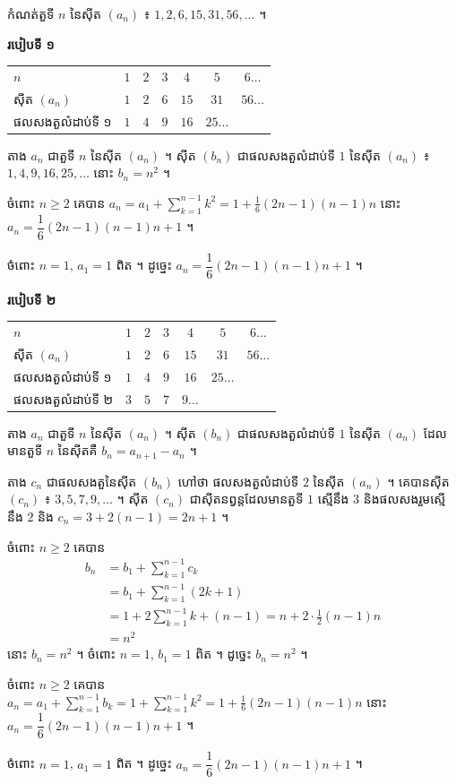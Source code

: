 \begin{example}[ឧទាហរណ៍]
កំណត់តួទី $n$ នៃស៊ីត $(a_n)$ ៖ $1, 2, 6, 15, 31, 56, \ldots$ ។

\textbf{របៀបទី ១}
\begin{center}
\begin{tabular}{lcccccc}
$n$ & $1$ & $2$ & $3$ & $4$ & $5$ & $6\ldots$\\
ស៊ីត $(a_n)$ & $1$ & $2$ & $6$ & $15$ & $31$ & $56\ldots$\\
ផលសងតួលំដាប់ទី ១ & $1$ & $4$ & $9$ & $16$ & $25\ldots$ &
\end{tabular}
\end{center}
តាង $a_n$ ជាតួទី $n$ នៃស៊ីត $(a_n)$ ។ ស៊ីត $(b_n)$ ជាផលសងតួលំដាប់ទី $1$ នៃស៊ីត $(a_n)$ ៖ $1, 4, 9, 16, 25, \ldots$ នោះ $b_n = n^2$ ។

ចំពោះ $n \ge 2$ គេបាន $a_n = a_1 + \displaystyle\sum_{k=1}^{n-1} k^2 = 1 + \frac{1}{6}(2n - 1)(n - 1)n$ នោះ $a_n = \dfrac{1}{6}(2n - 1)(n - 1)n + 1$ ។

ចំពោះ $n = 1$, $a_1 = 1$ ពិត ។ ដូច្នេះ $a_n = \dfrac{1}{6}(2n - 1)(n - 1)n + 1$ ។

\textbf{របៀបទី ២}
\begin{center}
\begin{tabular}{lcccccc}
$n$ & $1$ & $2$ & $3$ & $4$ & $5$ & $6\ldots$\\
ស៊ីត $(a_n)$ & $1$ & $2$ & $6$ & $15$ & $31$ & $56\ldots$\\
ផលសងតួលំដាប់ទី ១ & $1$ & $4$ & $9$ & $16$ & $25\ldots$ &\\
ផលសងតួលំដាប់ទី ២ & $3$ & $5$ & $7$ & $9\ldots$ & &
\end{tabular}
\end{center}
តាង $a_n$ ជាតួទី $n$ នៃស៊ីត $(a_n)$ ។ ស៊ីត $(b_n)$ ជាផលសងតួលំដាប់ទី $1$ នៃស៊ីត $(a_n)$ ដែលមានតួទី $n$ នៃស៊ីតគឺ $b_n = a_{n+1} - a_n$ ។

តាង $c_n$ ជាផលសងតួនៃស៊ីត $(b_n)$ ហៅថា ផលសងតួលំដាប់ទី $2$ នៃស៊ីត $(a_n)$ ។ គេបានស៊ីត $(c_n)$ ៖ $3, 5, 7, 9, \ldots$ ។ ស៊ីត $(c_n)$ ជាស៊ីតនព្វន្តដែលមានតួទី $1$ ស្មើនឹង $3$ និងផលសងរួមស្មើនឹង $2$ និង $c_n = 3 + 2(n - 1) = 2n + 1$ ។

ចំពោះ $n \ge 2$ គេបាន
\[
\begin{aligned}
b_n &= b_1 + \sum_{k=1}^{n-1} c_k\\
&= b_1 + \sum_{k=1}^{n-1} (2k + 1)\\
&= 1 + 2\sum_{k=1}^{n-1} k + (n - 1) = n + 2 \cdot \frac{1}{2}(n - 1)n\\
&= n^2
\end{aligned}
\]
នោះ $b_n = n^2$ ។ ចំពោះ $n = 1$, $b_1 = 1$ ពិត ។ ដូច្នេះ $b_n = n^2$ ។

ចំពោះ $n \ge 2$ គេបាន $a_n = a_1 + \displaystyle\sum_{k=1}^{n-1} b_k = 1 + \sum_{k=1}^{n-1} k^2 = 1 + \frac{1}{6}(2n - 1)(n - 1)n$ នោះ $a_n = \dfrac{1}{6}(2n - 1)(n - 1)n + 1$ ។

ចំពោះ $n = 1$, $a_1 = 1$ ពិត ។ ដូច្នេះ $a_n = \dfrac{1}{6}(2n - 1)(n - 1)n + 1$ ។
\end{example}

